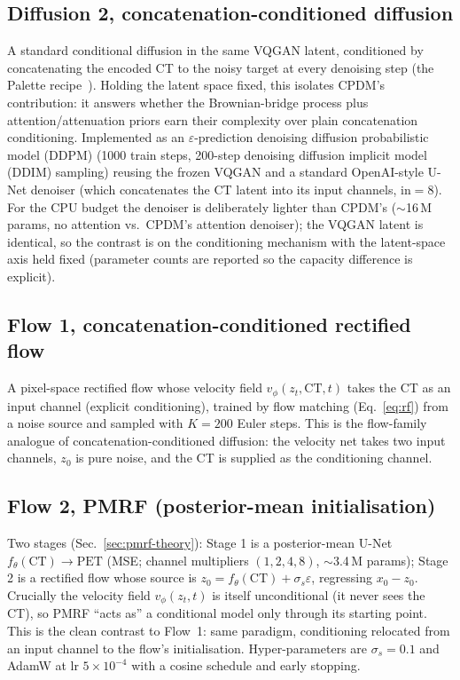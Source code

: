 \documentclass[11pt,a4paper]{article}
\begin{document}
\subsection{Diffusion 2, concatenation-conditioned diffusion}
A standard conditional diffusion in the same VQGAN latent, conditioned by
concatenating the encoded CT to the noisy target at every denoising step (the
Palette recipe~\parencite{saharia2022palette}). Holding the latent space fixed, this
isolates CPDM's contribution: it answers whether the Brownian-bridge process plus
attention/attenuation priors earn their complexity over plain concatenation
conditioning. Implemented as an $\varepsilon$-prediction denoising diffusion probabilistic model
(DDPM) (1000 train steps, 200-step denoising diffusion implicit model (DDIM) sampling) reusing
the frozen VQGAN and a standard OpenAI-style U-Net denoiser (which
concatenates the CT latent into its input channels, $\text{in}=8$). For the CPU budget the
denoiser is deliberately lighter than CPDM's ($\sim$16\,M params, no attention vs.\
CPDM's attention denoiser); the VQGAN latent is identical, so the contrast is on the
conditioning mechanism with the latent-space axis held fixed (parameter counts are reported
so the capacity difference is explicit).

\subsection{Flow 1, concatenation-conditioned rectified flow}
A pixel-space rectified flow whose velocity field $v_\phi(z_t,\text{CT},t)$ takes the CT
as an input channel (explicit conditioning), trained by flow matching
(Eq.~\ref{eq:rf}) from a noise source and sampled with $K{=}200$ Euler steps. This is the
flow-family analogue of concatenation-conditioned diffusion: the velocity net takes two input
channels, $z_0$ is pure noise, and the CT is supplied as the conditioning channel.

\subsection{Flow 2, PMRF (posterior-mean initialisation)}
Two stages (Sec.~\ref{sec:pmrf-theory}): Stage 1 is a posterior-mean U-Net
$f_\theta(\text{CT})\!\to\!\text{PET}$ (MSE; channel multipliers $(1,2,4,8)$, $\sim$3.4\,M
params); Stage 2 is a rectified flow whose source is $z_0 = f_\theta(\text{CT}) +
\sigma_s\varepsilon$, regressing $x_0-z_0$. Crucially the velocity field $v_\phi(z_t,t)$ is
itself unconditional (it never sees the CT), so PMRF ``acts as'' a
conditional model only through its starting point. This is the clean contrast to
Flow~1: same paradigm, conditioning relocated from an input channel to the flow's
initialisation. Hyper-parameters are $\sigma_s{=}0.1$ and AdamW at lr $5\times10^{-4}$ with a
cosine schedule and early stopping.
\end{document}
